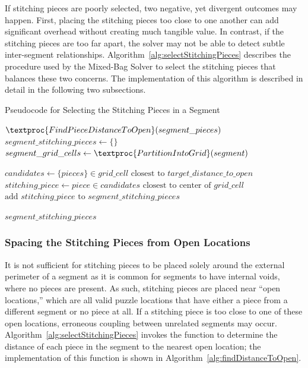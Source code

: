 If stitching pieces are poorly selected, two negative, yet divergent outcomes may happen.  First, placing the stitching pieces too close to one another can add significant overhead without creating much tangible value.  In contrast, if the stitching pieces are too far apart, the solver may not be able to detect subtle inter-segment relationships.  Algorithm~\ref{alg:selectStitchingPieces} describes the procedure used by the Mixed-Bag Solver to select the stitching pieces that balances these two concerns.  The implementation of this algorithm is described in detail in the following two subsections.

\begin{algorithm}[tb]
\caption{Pseudocode for Selecting the Stitching Pieces in a Segment}
\label{alg:selectStitchingPieces}
\begin{algorithmic}[1]
	\State $\textproc{FindPieceDistanceToOpen}(segment\_pieces)$
	\State $segment\_stitching\_pieces \gets \{ \}$
    \State $segment\_grid\_cells \gets \textproc{PartitionIntoGrid}(segment)$
\item []
			\State $candidates \gets \{ pieces \} \in grid\_cell \text{ closest to } target\_distance\_to\_open$
			\State $stitching\_piece \gets piece \in candidates \text{ closest to center of } grid\_cell$
			\State $\text{add } stitching\_piece \text{ to } segment\_stitching\_pieces$
		\EndIf
	\EndFor
\item []
	\State \Return $segment\_stitching\_pieces$
\EndProcedure
\end{algorithmic}
\end{algorithm}


\subsubsection{Spacing the Stitching Pieces from Open Locations}\label{sec:determiningSpacingToNearestOpenLocation}

It is not sufficient for stitching pieces to be placed solely around the external perimeter of a segment as it is common for segments to have internal voids, where no pieces are present.  As such, stitching pieces are placed near ``open locations,'' which are all valid puzzle locations that have either a piece from a different segment or no piece at all. If a stitching piece is too close to one of these open locations, erroneous coupling between unrelated segments may occur.  Algorithm~\ref{alg:selectStitchingPieces} invokes the function  to determine the distance of each piece in the segment to the nearest open location; the implementation of this function is shown in Algorithm~\ref{alg:findDistanceToOpen}.  

